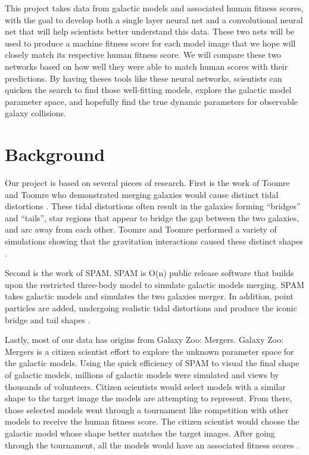 \documentclass[conference]{IEEEtran}
\begin{document}
This project takes data from galactic models and associated
human fitness scores, with the goal to develop both a single layer 
neural net and a convolutional neural net that will help scientists better understand this
data. These two nets will be used to produce a machine fitness score for each model image
that we hope will closely match its respective human fitness score. We will compare these two networks based on how well they were able to match human scores with their predictions.
By having theses tools like these neural networks, scientists can
quicken the search to find those well-fitting models, explore
the galactic model parameter space, and hopefully find the
true dynamic parameters for observable galaxy collisions.

\section{Background}

Our project is based on several pieces of research. First is
the work of Toomre and Toomre who demonstrated merging
galaxies would cause distinct tidal distortions \cite{Toomre}. These tidal
distortions often result in the galaxies forming “bridges” and
“tails”, star regions that appear to bridge the gap between the
two galaxies, and arc away from each other. Toomre and
Toomre performed a variety of simulations showing that the
gravitation interactions caused these distinct shapes \cite{Toomre}.

Second is the work of SPAM. SPAM is O(n) public release
software that builds upon the restricted three-body model to
simulate galactic models merging. SPAM takes galactic
models and simulates the two galaxies merger. In addition,
point particles are added, undergoing realistic tidal distortions
and produce the iconic bridge and tail shapes \cite{WallinJSPAM}.

Lastly, most of our data has origins from Galaxy Zoo:
Mergers. Galaxy Zoo: Mergers is a citizen scientist effort to
explore the unknown parameter space for the galactic models.
Using the quick efficiency of SPAM to visual the final shape of
galactic models, millions of galactic models were simulated
and views by thousands of volunteers. Citizen scientists would
select models with a similar shape to the target image the
models are attempting to represent. From there, those
selected models went through a tournament like competition
with other models to receive the human fitness score. The
citizen scientist would choose the galactic model whose shape
better matches the target images. After going through the
tournament, all the models would have an associated fitness
scores \cite{WallinGalaxyZoo}.
\end{document}
